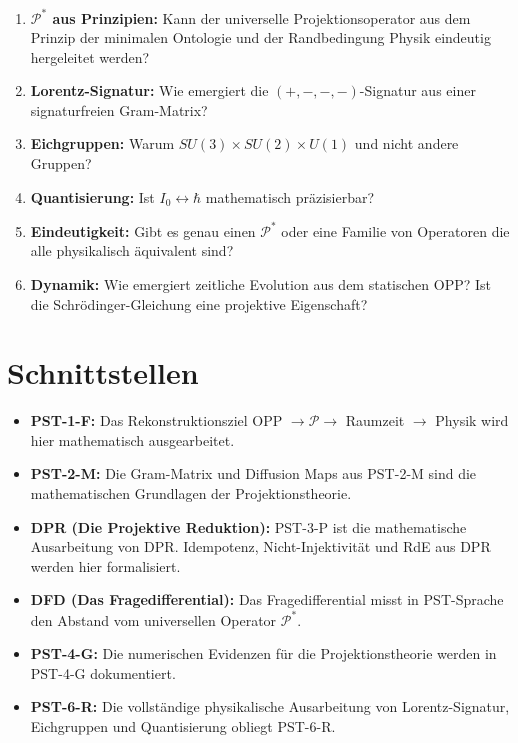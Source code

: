 \documentclass[11pt,a4paper]{article}
\theoremstyle{plain}
\theoremstyle{definition}
\newcommand{\Proj}{\mathcal{P}}
\begin{document}
\begin{enumerate}
  \item \textbf{$\Proj^\ast$ aus Prinzipien:} Kann der universelle
        Projektionsoperator aus dem Prinzip der minimalen Ontologie
        und der Randbedingung Physik eindeutig hergeleitet werden?
  \item \textbf{Lorentz-Signatur:} Wie emergiert die
        $(+,-,-,-)$-Signatur aus einer signaturfreien Gram-Matrix?
  \item \textbf{Eichgruppen:} Warum $SU(3) \times SU(2) \times U(1)$
        und nicht andere Gruppen?
  \item \textbf{Quantisierung:} Ist $I_0 \leftrightarrow \hbar$
        mathematisch pr\"{a}zisierbar?
  \item \textbf{Eindeutigkeit:} Gibt es genau einen $\Proj^\ast$ oder
        eine Familie von Operatoren die alle physikalisch \"{a}quivalent
        sind?
  \item \textbf{Dynamik:} Wie emergiert zeitliche Evolution aus dem
        statischen OPP? Ist die Schr\"{o}dinger-Gleichung eine
        projektive Eigenschaft?
\end{enumerate}

\section{Schnittstellen}

\begin{itemize}
  \item \textbf{PST-1-F:} Das Rekonstruktionsziel OPP $\rightarrow
        \mathcal{P} \rightarrow$ Raumzeit $\rightarrow$ Physik wird
        hier mathematisch ausgearbeitet.
  \item \textbf{PST-2-M:} Die Gram-Matrix und Diffusion Maps aus
        PST-2-M sind die mathematischen Grundlagen der Projektionstheorie.
  \item \textbf{DPR (Die Projektive Reduktion):} PST-3-P ist die
        mathematische Ausarbeitung von DPR. Idempotenz, Nicht-Injektivit\"{a}t
        und RdE aus DPR werden hier formalisiert.
  \item \textbf{DFD (Das Fragedifferential):} Das Fragedifferential
        misst in PST-Sprache den Abstand vom universellen Operator
        $\Proj^\ast$.
  \item \textbf{PST-4-G:} Die numerischen Evidenzen f\"{u}r die
        Projektionstheorie werden in PST-4-G dokumentiert.
  \item \textbf{PST-6-R:} Die vollst\"{a}ndige physikalische Ausarbeitung
        von Lorentz-Signatur, Eichgruppen und Quantisierung obliegt
        PST-6-R.
\end{itemize}
\end{document}
